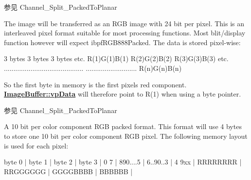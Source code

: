 \begin{Desc}
\begin{description}
\begin{DoxySeeAlso}{参见}
Channel\+\_\+\+Split\+\_\+\+Packed\+To\+Planar 
\end{DoxySeeAlso}
\item[{\em 
\hypertarget{group___common_interface_gga456e8aa76e06bb761f27c52141475985a418967d795f3c1bf0e0f6378a3ddb59e}{ibpf\+B\+G\+R888\+Packed}\label{group___common_interface_gga456e8aa76e06bb761f27c52141475985a418967d795f3c1bf0e0f6378a3ddb59e}
}]The image will be transferred as an R\+G\+B image with 24 bit per pixel. This is an interleaved pixel format suitable for most processing functions. Most blit/display function however will expect ibpf\+R\+G\+B888\+Packed. The data is stored pixel-\/wise\+:


\begin{DoxyCode}
3 bytes        3 bytes        3 bytes      etc.
R(1)G(1)B(1)   R(2)G(2)B(2)   R(3)G(3)B(3) etc.
..........................................
...........................   R(n)G(n)B(n)
\end{DoxyCode}


So the first byte in memory is the first pixels red component. {\bfseries \hyperlink{struct_image_buffer_ab67c9c21d749e786302c848b508e0673}{Image\+Buffer\+::vp\+Data}} will therefore point to R(1) when using a byte pointer.

\begin{DoxySeeAlso}{参见}
Channel\+\_\+\+Split\+\_\+\+Packed\+To\+Planar 
\end{DoxySeeAlso}
\item[{\em 
\hypertarget{group___common_interface_gga456e8aa76e06bb761f27c52141475985adf6ec458f7a0bdf9b559fc90511658a2}{ibpf\+B\+G\+R101010\+Packed\+\_\+\+V2}\label{group___common_interface_gga456e8aa76e06bb761f27c52141475985adf6ec458f7a0bdf9b559fc90511658a2}
}]A 10 bit per color component R\+G\+B packed format. This format will use 4 bytes to store one 10 bit per color component R\+G\+B pixel. The following memory layout is used for each pixel\+:


\begin{DoxyCode}
byte 0   | byte 1   | byte 2   | byte 3   |
0      7 | 890....5 | 6..90..3 | 4    9xx |
RRRRRRRR | RRGGGGGG | GGGGBBBB | BBBBBB   |
\end{DoxyCode}



\end{description}
\end{Desc}

